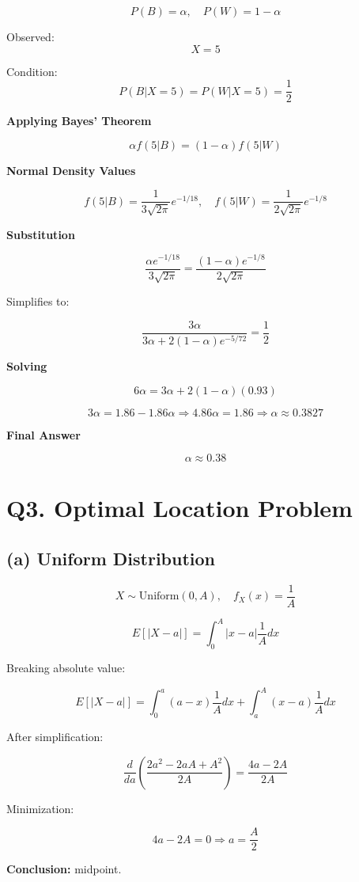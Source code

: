 \documentclass[11pt]{article}
\begin{document}
\[
P(B) = \alpha, \quad P(W) = 1 - \alpha
\]

Observed:
\[
X = 5
\]

Condition:
\[
P(B|X=5) = P(W|X=5) = \frac{1}{2}
\]

\textbf{Applying Bayes’ Theorem}

\[
\alpha f(5|B) = (1 - \alpha) f(5|W)
\]

\textbf{Normal Density Values}

\[
f(5|B) = \frac{1}{3\sqrt{2\pi}} e^{-1/18}, \quad
f(5|W) = \frac{1}{2\sqrt{2\pi}} e^{-1/8}
\]

\textbf{Substitution}

\[
\frac{\alpha e^{-1/18}}{3\sqrt{2\pi}} =
\frac{(1 - \alpha)e^{-1/8}}{2\sqrt{2\pi}}
\]

Simplifies to:

\[
\frac{3\alpha}{3\alpha + 2(1-\alpha)e^{-5/72}} = \frac{1}{2}
\]

\textbf{Solving}

\[
6\alpha = 3\alpha + 2(1-\alpha)(0.93)
\]

\[
3\alpha = 1.86 - 1.86\alpha
\Rightarrow 4.86\alpha = 1.86
\Rightarrow \alpha \approx 0.3827
\]

\textbf{Final Answer}

\[
\alpha \approx 0.38
\]

\section*{Q3. Optimal Location Problem}

\subsection*{(a) Uniform Distribution}

\[
X \sim \text{Uniform}(0,A), \quad f_X(x) = \frac{1}{A}
\]

\[
E[|X - a|] = \int_0^A |x - a| \frac{1}{A} dx
\]

Breaking absolute value:

\[
E[|X - a|] =
\int_0^a (a - x)\frac{1}{A} dx +
\int_a^A (x - a)\frac{1}{A} dx
\]

After simplification:

\[
\frac{d}{da} \left(\frac{2a^2 - 2aA + A^2}{2A}\right)
= \frac{4a - 2A}{2A}
\]

Minimization:

\[
4a - 2A = 0 \Rightarrow a = \frac{A}{2}
\]

\textbf{Conclusion:} midpoint.
\end{document}
